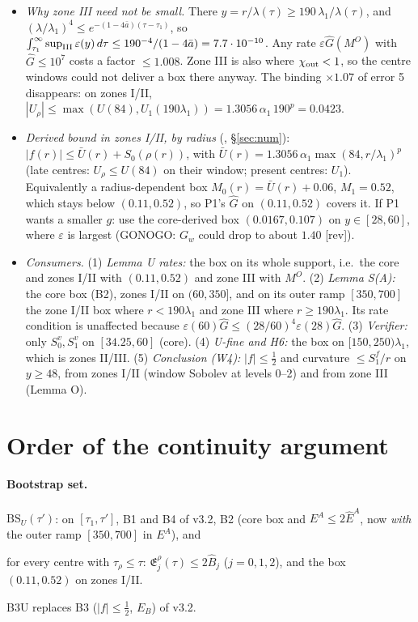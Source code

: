 \documentclass[11pt]{article}
\theoremstyle{remark}\newtheorem{remark}[theorem]{Remark}
\newcommand{\E}{\mathfrak E}
\begin{document}
\begin{itemize}[leftmargin=*,itemsep=2pt]
\item \emph{Why zone III need not be small.} There $y=r/\lambda(\tau)\ge190\,\lambda_1/\lambda(\tau)$, and $(\lambda/\lambda_1)^4\le e^{-(1-4\bar a)(\tau-\tau_1)}$, so $\int_{\tau_1}^\infty\sup_{\rm III}\varepsilon(y)\,d\tau\le190^{-4}/(1-4\bar a)=7.7\cdot10^{-10}$. Any rate $\varepsilon\hat G(M^O)$ with $\hat G\le10^7$ costs a factor $\le1.008$. Zone III is also where $\chi_{\rm out}<1$, so the centre windows could not deliver a box there anyway. The binding $\times1.07$ of error 5 disappears: on zones I/II, $|U_\rho|\le\max(U(84),U_1(190\lambda_1))=1.3056\,\alpha_1\,190^p=0.0423$.
\item \emph{Derived bound in zones I/II, by radius} (\tE, \S\ref{sec:num}): $|f(r)|\le\bar U(r)+S_0(\rho(r))$, with $\bar U(r)=1.3056\,\alpha_1\max(84,r/\lambda_1)^p$ (late centres: $U_\rho\le U(84)$ on their window; present centres: $U_1$). Equivalently a radius-dependent box $M_0(r)=\bar U(r)+0.06$, $M_1=0.52$, which stays below $(0.11,0.52)$, so P1's $\hat G$ on $(0.11,0.52)$ covers it. If P1 wants a smaller $g$: use the core-derived box $(0.0167,0.107)$ on $y\in[28,60]$, where $\varepsilon$ is largest (GONOGO: $G_w$ could drop to about $1.40$ [rev]).
\item \emph{Consumers.}
(1) \emph{Lemma U rates:} the box on its whole support, i.e.\ the core and zones I/II with $(0.11,0.52)$ and zone III with $M^O$.
(2) \emph{Lemma S(A):} the core box (B2), zones I/II on $(60,350]$, and on its outer ramp $[350,700]$ the zone I/II box where $r<190\lambda_1$ and zone III where $r\ge190\lambda_1$. Its rate condition is unaffected because $\varepsilon(60)\hat G\le(28/60)^4\varepsilon(28)\hat G$.
(3) \emph{Verifier:} only $S_0^v,S_1^v$ on $[34.25,60]$ (core).
(4) \emph{U-fine and H6:} the box on $[150,250)\lambda_1$, which is zones II/III.
(5) \emph{Conclusion (W4):} $|f|\le\frac12$ and curvature $\le S_1^f/r$ on $y\ge48$, from zones I/II (window Sobolev at levels 0--2) and from zone III (Lemma O).
\end{itemize}

\section{Order of the continuity argument}\label{sec:order}
\paragraph{Bootstrap set.} $\mathrm{BS}_U(\tau')$: on $[\tau_1,\tau']$, B1 and B4 of v3.2, B2 (core box and $E^A\le2\hat E^A$, now \emph{with} the outer ramp $[350,700]$ in $E^A$), and
\begin{description}[leftmargin=1.2em,itemsep=1pt]
\item[B3U] for every centre with $\tau_\rho\le\tau$: $\E^\rho_j(\tau)\le2\hat B_j$ ($j=0,1,2$), and the box $(0.11,0.52)$ on zones I/II.
\end{description}
B3U replaces B3 ($|f|\le\frac12$, $E_B$) of v3.2.
\end{document}
